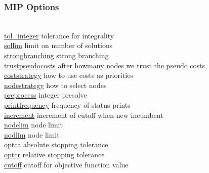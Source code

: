 \subsubsection{MIP Options}
\begin{tabbing}
\hspace {1.3in} \= \\
\hyperlink{tol_integer}
{tol\_integer} \> tolerance for integrality \\
\hyperlink{sollim}
{sollim} \> limit on number of solutions \\
\hyperlink{strongbranching}
{strongbranching} \> strong branching \\
\hyperlink{trustpseudocosts}
{trustpseudocosts} \> after howmany nodes we trust the pseudo costs \\
\hyperlink{coststrategy}
{coststrategy} \> how to use costs as priorities \\
\hyperlink{nodestrategy}
{nodestrategy} \> how to select nodes \\
\hyperlink{preprocess}
{preprocess} \> integer presolve \\
\hyperlink{printfrequency}
{printfrequency} \> frequency of status prints \\
\hyperlink{increment}
{increment} \> increment of cutoff when new incumbent \\
\hyperlink{nodelim}
{nodelim} \> node limit \\
\hyperlink{nodlim}
{nodlim} \> node limit \\
\hyperlink{optca}
{optca} \> absolute stopping tolerance \\
\hyperlink{optcr}
{optcr} \> relative stopping tolerance \\
\hyperlink{cutoff}
{cutoff} \> cutoff for objective function value \\
\end{tabbing}


